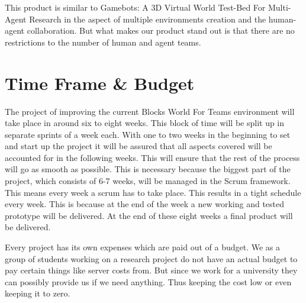 \documentclass[oneside]{tudelft-report}
\begin{document}
This product is similar to Gamebots: A 3D Virtual World Test-Bed For Multi-Agent Research \cite{adobbati2001gamebots} in the aspect of multiple environments creation and the human-agent collaboration. But what makes our product stand out is that there are no restrictions to the number of human and agent teams.

\chapter{Time Frame \& Budget}
The project of improving the current Blocks World For Teams environment will take place in around six to eight weeks. This block of time will be split up in separate sprints of a week each. With one to two weeks in the beginning to set and start up the project it will be assured that all aspects covered will be accounted for in the following weeks. This will ensure that the rest of the process will go as smooth as possible. This is necessary because the biggest part of the project, which consists of 6-7 weeks, will be managed in the Scrum framework. This means every week a scrum has to take place. This results in a tight schedule every week. This is because at the end of the week a new working and tested prototype will be delivered. At the end of these eight weeks a final product will be delivered.

Every project has its own expenses which are paid out of a budget. We as a group of students working on a research project do not have an actual budget to pay certain things like server costs from. But since we work for a university they can possibly provide us if we need anything. Thus keeping the cost low or even keeping it to zero.


\printglossaries


\clearpage


\end{document}
